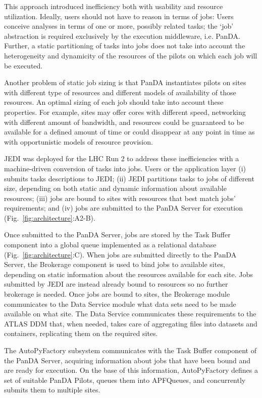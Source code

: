 This approach introduced inefficiency both with usability and resource
utilization. Ideally, users should not have to reason in terms of jobs: Users
conceive analyses in terms of one or more, possibly related tasks; the `job'
abstraction is required exclusively by the execution middleware, i.e. PanDA.
Further, a static partitioning of tasks into jobs does not take into account the
heterogeneity and dynamicity of the resources of the pilots on which each job
will be executed.

Another problem of static job sizing is that PanDA instantiates pilots on sites
with different type of resources and different models of availability of those
resources. An optimal sizing of each job should take into account these
properties. For example, sites may offer cores with different speed, networking
with different amount of bandwidth, and resources could be guaranteed to be
available for a defined amount of time or could disappear at any point in time
as with opportunistic models of resource provision.

JEDI was deployed for the LHC Run 2 to address these inefficiencies with a
machine-driven conversion of tasks into jobs. Users or the application layer (i)
submits tasks descriptions to JEDI; (ii) JEDI partitions tasks to jobs of
different size, depending on both static and dynamic information about available
resources; (iii) jobs are bound to sites with resources that best match jobs'
requirements; and (iv) jobs are submitted to the PanDA Server for execution
(Fig.~\ref{fig:architecture}:A2-B).

Once submitted to the PanDA Server, jobs are stored by the Task Buffer component
into a global queue implemented as a relational database
(Fig.~\ref{fig:architecture}:C). When jobs are submitted directly to the PanDA
Server, the Brokerage component is used to bind jobs to available sites,
depending on static information about the resources available for each site.
Jobs submitted by JEDI are instead already bound to resources so no further
brokerage is needed. Once jobs are bound to sites, the Brokerage module
communicates to the Data Service module what data sets need to be made available
on what site. The Data Service communicates these requirements to the ATLAS DDM
that, when needed, takes care of aggregating files into datasets and containers,
replicating them on the required sites.

The AutoPyFactory subsystem communicates with the Task Buffer component of the
PanDA Server, acquiring information about jobs that have been bound and are
ready for execution. On the base of this information, AutoPyFactory defines a
set of suitable PanDA Pilots, queues them into APFQueues, and concurrently
submits them to multiple sites.

